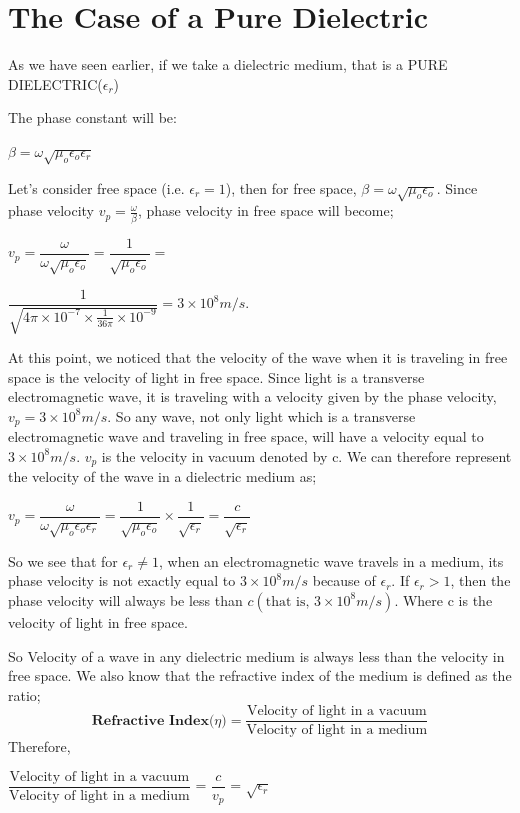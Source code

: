 \section{\textbf{The Case of a Pure Dielectric}}

As we have seen earlier, if we take a dielectric medium, that is a PURE DIELECTRIC($\epsilon_{r}$)

The phase constant will be:

\begin{center}
$\beta=\omega\sqrt{\mu_{o}\epsilon_{o}\epsilon_{r}}$ 
\end{center}

Let's consider free space (i.e. $\epsilon_{r}=1 $), then for free space, $\beta=\omega\sqrt{\mu_{o}\epsilon_{o}}$.
Since phase velocity $v_p=\frac{\omega}{\beta}$, phase velocity in free space will become;

$v_p=\dfrac{\omega}{\omega\sqrt{\mu_{o}\epsilon_{o}}}=\dfrac{1}{\sqrt{\mu_{o}\epsilon_{o}}}=$ 

$\dfrac{1}{\sqrt{4\pi\times 10^{-7}\times \frac{1}{36\pi}\times 10^{-9}}}=3\times 10^{8}m/s.$

At this point, we noticed that the velocity of the wave when it is traveling in free space is the velocity of light in free space. Since light is a transverse electromagnetic wave, it is traveling with a velocity given by the phase velocity, $v_p=3\times 10^{8}m/s$. So any wave, not only light which is a transverse electromagnetic wave and traveling in free space, will have a velocity equal to $3\times 10^{8}m/s$. $v_p$ is the velocity in vacuum denoted by c.
We can therefore represent the velocity of the wave in a dielectric medium as;

$v_p=\dfrac{\omega}{\omega\sqrt{\mu_{o}\epsilon_{o}\epsilon_{r}}}=\dfrac{1}{\sqrt{\mu_{o}\epsilon_{o}}}\times \dfrac{1}{\sqrt{\epsilon_{r}}}=\dfrac{c}{\sqrt{\epsilon_{r}}}$

So we see that for $\epsilon_{r}\neq 1$, when an electromagnetic wave travels in a medium, its phase velocity is not exactly equal to  $3\times 10^{8}m/s$ because of $\epsilon_{r}$. If $\epsilon_{r}>1$, then the phase velocity will always be less than $c( \text{that is,  } 3\times 10^{8}m/s)$. Where c is the velocity of light in free space.

So Velocity of a wave in any dielectric medium is always less than the velocity in free space. We also know that the refractive index of the medium is defined as the ratio;
\begin{equation}
\textbf{Refractive Index($\eta$)} =	\dfrac{\text{Velocity of light in a vacuum}}{\text{Velocity of light in a medium}}
\end{equation}
Therefore,
\begin{center}
$\dfrac{\text{Velocity of light in a vacuum}}{\text{Velocity of light in a medium}}$	
= $\dfrac{c}{v_{p}}$ = $\sqrt{\epsilon_{r}}$  
\end{center}

